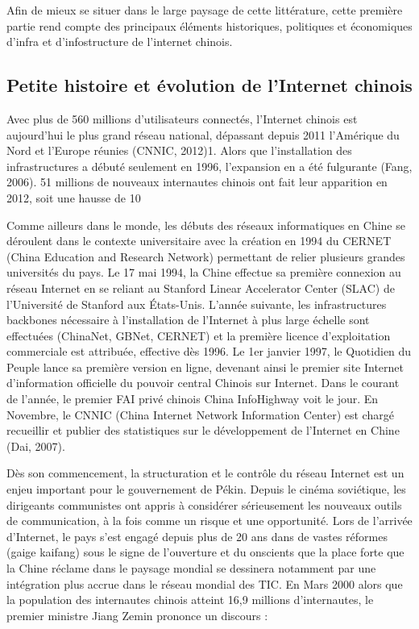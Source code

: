 Afin de mieux se situer dans le large paysage de cette littérature, cette première partie rend compte des principaux éléments historiques, politiques et économiques d’infra et d’infostructure de l’internet chinois.

\subsection[Petite histoire et évolution de l’Internet chinois]{Petite histoire et évolution de l’Internet chinois}

Avec plus de 560 millions d’utilisateurs connectés, l’Internet chinois est aujourd’hui le plus grand réseau national, dépassant depuis 2011 l’Amérique du Nord et l’Europe réunies (CNNIC, 2012)1. Alors que l’installation des infrastructures a débuté seulement en 1996, l’expansion en a été fulgurante (Fang, 2006). 51 millions de nouveaux internautes chinois ont fait leur apparition en 2012, soit une hausse de 10%

Comme ailleurs dans le monde, les débuts des réseaux informatiques en Chine se déroulent dans le contexte universitaire avec la création en 1994 du CERNET (China Education and Research Network) permettant de relier plusieurs grandes universités du pays. Le 17 mai 1994, la Chine effectue sa première connexion au réseau Internet en se reliant au Stanford Linear Accelerator Center (SLAC) de l’Université de Stanford aux États-Unis. L’année suivante, les infrastructures backbones nécessaire à l’installation de l’Internet à plus large échelle sont effectuées (ChinaNet, GBNet, CERNET) et la première licence d’exploitation commerciale est attribuée, effective dès 1996. Le 1er janvier 1997, le Quotidien du Peuple lance sa première version en ligne, devenant ainsi le premier site Internet d’information officielle du pouvoir central Chinois sur Internet. Dans le courant de l’année, le premier FAI privé chinois China InfoHighway voit le jour. En Novembre, le CNNIC (China Internet Network Information Center) est chargé recueillir et publier des statistiques sur le développement de l’Internet en Chine (Dai, 2007).

Dès son commencement, la structuration et le contrôle du réseau Internet est un enjeu important pour le gouvernement de Pékin. Depuis le cinéma soviétique, les dirigeants communistes ont appris à considérer sérieusement les nouveaux outils de communication, à la fois comme un risque et une opportunité. Lors de l’arrivée d’Internet, le pays s’est engagé depuis plus de 20 ans dans de vastes réformes (gaige kaifang) sous le signe de l’ouverture et du 
onscients que la place forte que la Chine réclame dans le paysage mondial se dessinera notamment par une intégration plus accrue dans le réseau mondial des TIC. En Mars 2000 alors que la population des internautes chinois atteint 16,9 millions d’internautes, le premier ministre Jiang Zemin prononce un discours :


